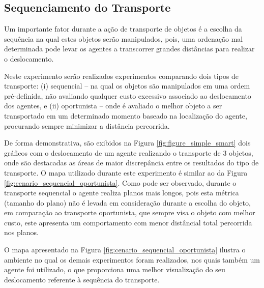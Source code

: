 
\subsection{Sequenciamento do Transporte} %
\label{sub:tipo_de_transporte}

Um importante fator durante a ação de transporte de objetos é a escolha da sequência na qual estes objetos serão manipulados, pois, uma ordenação mal determinada pode levar os agentes a transcorrer grandes distâncias para realizar o deslocamento.

Neste experimento serão realizados experimentos comparando dois tipos de transporte: (i) sequencial -- na qual os objetos são manipulados em uma ordem pré-definida, não avaliando qualquer custo excessivo associado ao deslocamento dos agentes, e (ii) oportunista -- onde é avaliado o melhor objeto a ser transportado em um determinado momento baseado na localização do agente, procurando sempre minimizar a distância percorrida.

De forma demonstrativa, são exibidos na Figura \ref{fig:figure_simple_smart} dois gráficos com o deslocamento de um agente realizando o transporte de 3 objetos, onde são destacadas as áreas de maior discrepância entre os resultados do tipo de transporte.
O mapa utilizado durante este experimento é similar ao da Figura \ref{fig:cenario_sequencial_oportunista}.
Como pode ser observado, durante o transporte sequencial o agente realiza planos mais longos, pois esta métrica (tamanho do plano) não é levada em consideração durante a escolha do objeto, em comparação ao transporte oportunista, que sempre visa o objeto com melhor custo, este apresenta um comportamento com menor distâncial total percorrida nos planos.

O mapa apresentado na Figura \ref{fig:cenario_sequencial_oportunista} ilustra o ambiente no qual os demais experimentos foram realizados, nos quais também um agente foi utilizado, o que proporciona uma melhor visualização do seu deslocamento referente à sequência do transporte.

